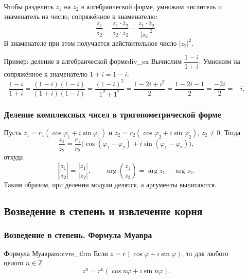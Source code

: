\documentclass[12pt,a4paper]{article}
\begin{document}
Чтобы разделить $z_1$ на $z_2$ в алгебраической форме, умножим числитель
и знаменатель на число, сопряжённое к знаменателю:
\[
  \frac{z_1}{z_2} = \frac{z_1 \cdot \bar{z}_2}{z_2 \cdot \bar{z}_2}
  = \frac{z_1 \cdot \bar{z}_2}{|z_2|^2}.
\]
В знаменателе при этом получается действительное число $|z_2|^2$.

\begin{definition}{Пример: деление в алгебраической форме}{div_ex}
  Вычислим $\dfrac{1 - i}{1 + i}$. Умножим на сопряжённое к знаменателю
  $\overline{1+i} = 1 - i$:
  \[
    \frac{1 - i}{1 + i} = \frac{(1 - i)(1 - i)}{(1 + i)(1 - i)}
    = \frac{(1 - i)^2}{1^2 + 1^2}
    = \frac{1 - 2i + i^2}{2}
    = \frac{1 - 2i - 1}{2}
    = \frac{-2i}{2} = -i.
  \]
\end{definition}

\subsubsection*{Деление комплексных чисел в тригонометрической форме}

Пусть $z_1 = r_1(\cos\varphi_1 + i\sin\varphi_1)$ и
$z_2 = r_2(\cos\varphi_2 + i\sin\varphi_2)$, $z_2 \neq 0$. Тогда
\begin{equation}
  \frac{z_1}{z_2} = \frac{r_1}{r_2}\bigl(\cos(\varphi_1 - \varphi_2)
  + i\sin(\varphi_1 - \varphi_2)\bigr),
  \tag{12.2}
  \label{eq:div}
\end{equation}
откуда
\[
  \left|\frac{z_1}{z_2}\right| = \frac{|z_1|}{|z_2|}, \qquad
  \arg\!\left(\frac{z_1}{z_2}\right) = \arg z_1 - \arg z_2.
\]
Таким образом, при делении модули делятся, а аргументы вычитаются.

\subsection*{Возведение в степень и извлечение корня}

\subsubsection*{Возведение в степень. Формула Муавра}

\begin{theorem}{Формула Муавра}{moivre_thm}
  Если $z = r(\cos\varphi + i\sin\varphi)$, то для любого целого
  $n \in \mathbb{Z}$
  \begin{equation}
    z^n = r^n(\cos n\varphi + i\sin n\varphi).
    \tag{12.3}
    \label{eq:moivre}
  \end{equation}
\end{theorem}
\end{document}
